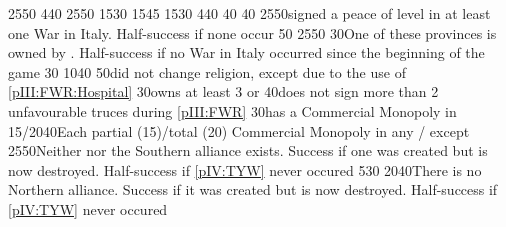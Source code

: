{25}{50}{\EU@objWoSS}%
%
%
{4}{40}{\EU@objEastIndiesConvoy}%
%
%
%
{25}{50}{\EU@objIndependanceWars}%
%
%
{15}{30}{\EU@objFranceContained}%
%
%
{15}{45}{\EU@objEachCC}%
%
%
{15}{30}{\EU@objSYW}
%
%
{4}{40}{\EU@objEastIndiesConvoy}%
%
%
%
 
%
%
{}{40}{\EU@objCalaisFRA}%
%
%
%
%
%
{}{40}{\EU@objSDCF}%
%
%
%
%
{25}{50}{\paysmajeurFrance signed a peace of level  in at least one War
  in Italy. Half-success if none occur}%
%
%
%
{}{50}{\EU@objCalaisFRA}%
%
%
%
%
{25}{50}{}%
%
%
%
%
{}{30}{One of these provinces is owned by \paysmajeurFrance. Half-success if
  no War in Italy occurred since the beginning of the game}%
%
%
%
{}{30}{}%
%
%
%
{10}{40}{}%
%
%
{}{50}{\paysmajeurFrance did not change religion, except due to the use of
  \ref{pIII:FWR:Hospital}}%
%
%
\EUobjective{}{\geq 3 \COL/\TP}{}%
{}{30}{\paysmajeurFrance owns at least 3 \COL or \TP}%
%
%
%
{}{40}{\paysmajeurFrance does not sign more than 2 unfavourable truces during
  \ref{pIII:FWR}}%
%
%
%
{}{30}{\paysmajeurFrance has a Commercial Monopoly in }%
%
%
%
{15/20}{40}{Each partial (15)/total (20) Commercial Monopoly in any \STZ/\CTZ
  except }%
%
%
%
{25}{50}{Neither \GE nor the Southern \HRE alliance exists. Success if one was
  created but is now destroyed. Half-success if \ref{pIV:TYW} never occured}%
%
%
{5}{30}{\EU@objEachCOL}%
%
%
{20}{40}{There is no Northern \HRE alliance. Success if it was created but is
  now destroyed. Half-success if \ref{pIV:TYW} never occured}%
